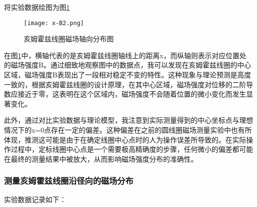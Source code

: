 \documentclass[11pt]{article}
\begin{document}
	\begin{table}[H]\centering
		\caption{亥姆霍兹线圈轴线上的磁场分布}
		\label{亥姆霍兹线圈轴线上的磁场分布}
	\end{table}
	将实验数据绘图为图\ref{fig:x-B2}
	
	\begin{figure}[H]
		\centering
		\texttt{[image: x-B2.png]}
		\caption{亥姆霍兹线圈磁场轴向分布图}
		\label{fig:x-B2}
	\end{figure}
	
	在图\ref{fig:x-B2}中，横轴代表的是亥姆霍兹线圈轴线上的距离x，而纵轴则表示对应位置处的磁场强度B。通过细致地观察图中的数据点，我可以发现在亥姆霍兹线圈的中心区域，磁场强度B表现出了一段相对稳定不变的特性。这种现象与理论预测是高度一致的，根据亥姆霍兹线圈的设计原理，在其中心区域，磁场强度对位移的二阶导数应接近于零，这表明在这个区域内，磁场强度不会随着位置的微小变化而发生显著变化。
	
	此外，通过对比实验数据与理论模型，我注意到实际测量得到的中心坐标点与理想情况下的x=0点存在一定的偏差。这种偏差在之前的圆线圈磁场测量实验中也有所体现，推测这可能是由于在确定线圈中心点时的人为操作误差所导致的。在实际操作过程中，定标线圈中心点是一个需要极高精确度的步骤，任何微小的偏差都可能在最终的测量结果中被放大，从而影响磁场强度分布的准确性。
	
	\subsubsection{测量亥姆霍兹线圈沿径向的磁场分布}
	实验数据记录如下：
	\begin{table}[H]\centering
		\caption{亥姆霍兹线圈的径向磁场分布}
		\label{亥姆霍兹线圈的径向磁场分布}
	\end{table}
	
\end{document}
